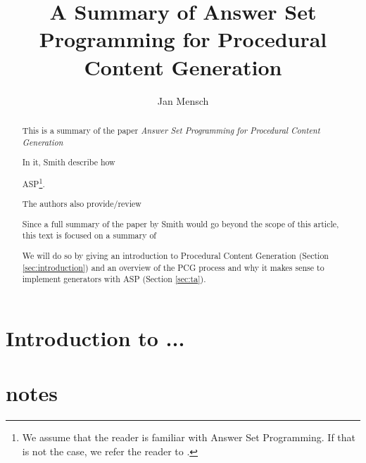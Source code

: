 \documentclass[runningheads]{llncs}
\newcommand{\papertitle}{Answer Set Programming for Procedural Content Generation}
\newcommand{\authorquote}{Smith \etal}
\begin{document}
\title{A Summary of \papertitle}

\author{Jan Mensch}




%
\maketitle              %


\begin{abstract}
This is a summary of the paper \textit{\papertitle} 

In it, \authorquote{} describe how

ASP\footnote{We assume that the reader is familiar with Answer Set Programming. If that is not the case, we refer the reader to \cite{erdem2016applications}.}. 

The authors also provide/review

Since a full summary of the paper by \authorquote{} would go beyond the scope of this article, this text is focused on a summary of

We will do so by giving an introduction to Procedural Content Generation (Section \ref{sec:introduction}) and an overview of the PCG process and why it makes sense to implement generators with ASP (Section \ref{sec:ta}). 

\end{abstract}


\section{Introduction to ...} \label{sec:introduction}



\section{notes}
\end{document}
